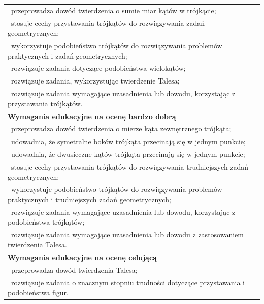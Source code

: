 \documentclass[12pt,a4paper]{article}
\begin{document}
\begin{longtable}{|p{16cm}|}
		\textbullet\ przeprowadza dowód twierdzenia o sumie miar kątów w trójkącie; \\
		
		\textbullet\ stosuje cechy przystawania trójkątów do rozwiązywania zadań geometrycznych; \\
		
		\textbullet\ wykorzystuje podobieństwo trójkątów do rozwiązywania problemów praktycznych i zadań geometrycznych; \\
		
		\textbullet\ rozwiązuje zadania dotyczące podobieństwa wielokątów; \\
		
		\textbullet\ rozwiązuje zadania, wykorzystując twierdzenie Talesa; \\
		
		\textbullet\ rozwiązuje zadania wymagające uzasadnienia lub dowodu, korzystając z przystawania trójkątów. \\ \hline
		
		\textbf{Wymagania edukacyjne na ocenę bardzo dobrą} \\ \hline
		
		\textbullet\ przeprowadza dowód twierdzenia o mierze kąta zewnętrznego trójkąta; \\
		
		\textbullet\ udowadnia, że symetralne boków trójkąta przecinają się w jednym punkcie; \\
		
		\textbullet\ udowadnia, że dwusieczne kątów trójkąta przecinają się w jednym punkcie; \\
		
		\textbullet\ stosuje cechy przystawania trójkątów do rozwiązywania trudniejszych zadań geometrycznych; \\
		
		\textbullet\ wykorzystuje podobieństwo trójkątów do rozwiązywania problemów praktycznych i trudniejszych zadań geometrycznych; \\
		
		\textbullet\ rozwiązuje zadania wymagające uzasadnienia lub dowodu, korzystając z podobieństwa trójkątów; \\
		
		\textbullet\ rozwiązuje zadania wymagające uzasadnienia lub dowodu z zastosowaniem twierdzenia Talesa. \\ \hline
		
		\textbf{Wymagania edukacyjne na ocenę celującą} \\ \hline
		
		\textbullet\ przeprowadza dowód twierdzenia Talesa; \\
		
		\textbullet\ rozwiązuje zadania o znacznym stopniu trudności dotyczące przystawania i podobieństwa figur. \\ \hline
		
	\end{longtable}
	
\end{document}
